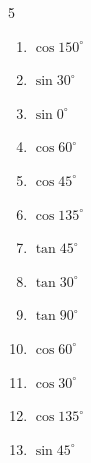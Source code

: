 \begin{multicols}{5}
\begin{enumerate}
  \item $\displaystyle \cos{150^\circ}$


  \item $\displaystyle \sin{30^\circ}$


  \item $\displaystyle \sin{0^\circ}$

        \phantom{$\displaystyle =0$}

  \item $\displaystyle \cos{60^\circ}$


\columnbreak %

  \item $\displaystyle \cos{45^\circ}$


  \item $\displaystyle \cos{135^\circ}$


  \item $\displaystyle \tan{45^\circ}$

        \phantom{$\displaystyle =1$}

  \item $\displaystyle \tan{30^\circ}$


  \item $\displaystyle \tan{90^\circ}$

        \phantom{$\displaystyle なし$}

  \item $\displaystyle \cos{60^\circ}$


  \item $\displaystyle \cos{30^\circ}$


  \item $\displaystyle \cos{135^\circ}$


  \item $\displaystyle \sin{45^\circ}$


\end{enumerate}
\end{multicols}
